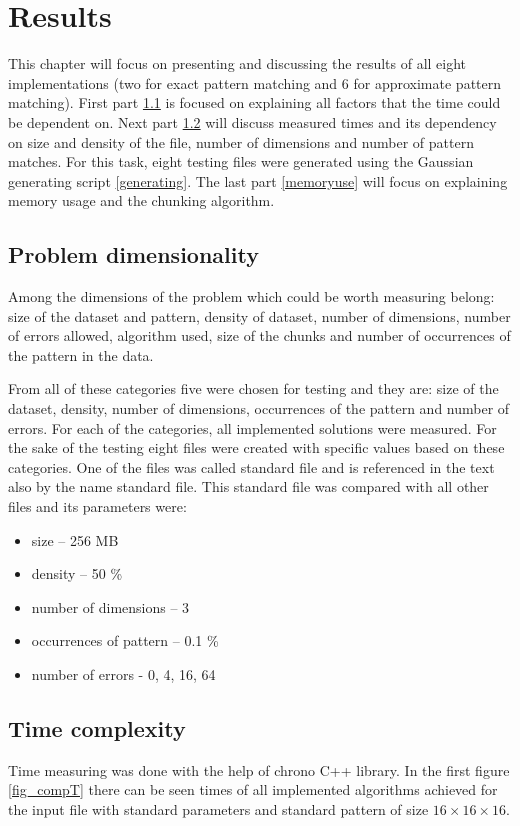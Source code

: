 \chapter{Results} \label{results}
This chapter will focus on presenting and discussing the results of all eight implementations (two for exact pattern matching and 6 for approximate pattern matching). First part \ref{problemdim} is focused on explaining all factors that the time could be dependent on. Next part \ref{timecomplex} will discuss measured times and its dependency on size and density of the file, number of dimensions and number of pattern matches. For this task, eight testing files were generated using the Gaussian generating script \ref{generating}. The last part \ref{memoryuse} will focus on explaining memory usage and the chunking algorithm.

\section{Problem dimensionality} \label{problemdim}
Among the dimensions of the problem which could be worth measuring belong: size of the dataset and pattern, density of dataset, number of dimensions, number of errors allowed, algorithm used, size of the chunks and number of occurrences of the pattern in the data.

From all of these categories five were chosen for testing and they are: size of the dataset, density, number of dimensions, occurrences of the pattern and number of errors. For each of the categories, all implemented solutions were measured. For the sake of the testing eight files were created with specific values based on these categories. One of the files was called standard file and is referenced in the text also by the name standard file. This standard file was compared with all other files and its parameters were: 
\begin{itemize}
\item size -- 256 MB
\item density -- 50 \%
\item number of dimensions -- 3
\item occurrences of pattern -- 0.1 \%
\item number of errors - 0, 4, 16, 64
\end{itemize}

\section{Time complexity} \label{timecomplex}
Time measuring was done with the help of chrono C++ library. In the first figure \ref{fig_compT} there can be seen times of all implemented algorithms achieved for the input file with standard parameters and standard pattern of size $16\times16\times16$. 

